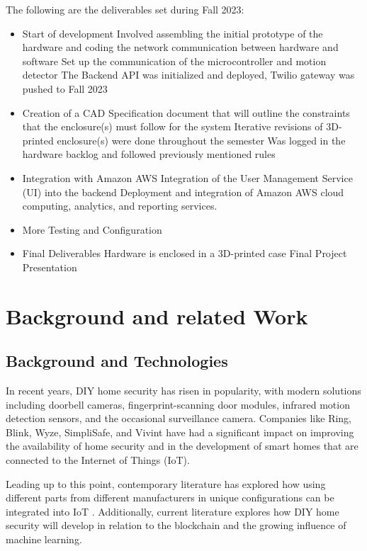 \documentclass[conference]{IEEEtran}
\begin{document}
The following are the deliverables set during Fall 2023:
\begin{itemize}
      \item Start of development
            \subitem Involved assembling the initial prototype of the hardware and coding
            the network communication between hardware and software
            \subitem Set up the communication of the microcontroller and motion detector
            \subitem The Backend API was initialized and deployed, Twilio gateway was pushed to Fall 2023
      \item Creation of a CAD Specification document that will outline the constraints
            that the enclosure(s) must follow for the system
            \subitem Iterative revisions of 3D-printed enclosure(s) were done throughout the
            semester
            \subitem Was logged in the hardware backlog and followed previously mentioned rules
      \item Integration with Amazon AWS
            \subitem Integration of the User Management Service (UI) into the backend
            \subitem Deployment and integration of Amazon AWS cloud computing,
            analytics, and reporting services.
      \item More Testing and Configuration
      \item Final Deliverables
            \subitem Hardware is enclosed in a 3D-printed case
            \subitem Final Project Presentation
\end{itemize}

\section{Background and related Work}

\subsection{Background and Technologies}

In recent years, DIY home security has risen in popularity, with modern solutions including
doorbell cameras, fingerprint-scanning door modules, infrared motion detection sensors, and
the occasional surveillance camera. Companies like Ring, Blink, Wyze, SimpliSafe, and Vivint
have had a significant impact on improving the availability of home security and in the
development of smart homes that are connected to the Internet of Things (IoT).

Leading up to this point, contemporary literature has explored how using different parts
from different manufacturers in unique configurations can be integrated into
IoT \cite{sarhan2020}. Additionally, current literature explores how DIY home security
will develop in relation to the blockchain \cite{arifEtAl_2020} and the growing influence
of machine learning\cite{khanEtAl2021}.
\end{document}

